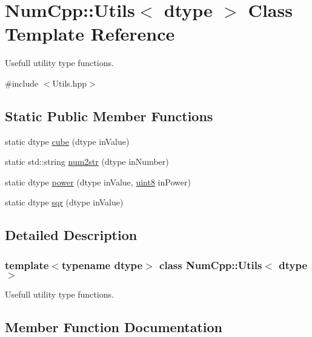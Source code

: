 \hypertarget{class_num_cpp_1_1_utils}{}\section{Num\+Cpp\+:\+:Utils$<$ dtype $>$ Class Template Reference}
\label{class_num_cpp_1_1_utils}


Usefull utility type functions.  




{\ttfamily \#include $<$Utils.\+hpp$>$}

\subsection*{Static Public Member Functions}
\begin{DoxyCompactItemize}
\item 
static dtype \mbox{\hyperlink{class_num_cpp_1_1_utils_af258e74cbd7e195dfa49bd9e3b93f0fe}{cube}} (dtype in\+Value)
\item 
static std\+::string \mbox{\hyperlink{class_num_cpp_1_1_utils_a74264d0d7d8c54c77bb8d7a75a7f0062}{num2str}} (dtype in\+Number)
\item 
static dtype \mbox{\hyperlink{class_num_cpp_1_1_utils_a3cf3be763f2bf8c2025bdc39cc81e9c0}{power}} (dtype in\+Value, \mbox{\hyperlink{namespace_num_cpp_aee396d0469d6031cd18118c0a45bcdda}{uint8}} in\+Power)
\item 
static dtype \mbox{\hyperlink{class_num_cpp_1_1_utils_a9cf764a51a81bf94d1f2dfec9766d8f9}{sqr}} (dtype in\+Value)
\end{DoxyCompactItemize}


\subsection{Detailed Description}
\subsubsection*{template$<$typename dtype$>$\newline
class Num\+Cpp\+::\+Utils$<$ dtype $>$}

Usefull utility type functions. 

\subsection{Member Function Documentation}
\mbox{\label{class_num_cpp_1_1_utils_af258e74cbd7e195dfa49bd9e3b93f0fe}} 
